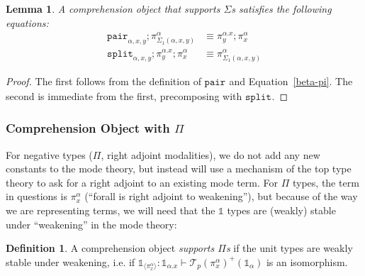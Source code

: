 \documentclass[10pt]{article}
\newtheorem{lemma}{Lemma}
\theoremstyle{definition}
\newtheorem{definition}{Definition}
\newcommand{\id}{\mathsf{id}}
\newcommand\TrPlus[2]{\ensuremath{{#1}^+(#2)}}
\newcommand\El[2]{\mathcal{T}_{#1}(#2)}
\newcommand\bdot[0]{\mathbin{.}}
\newcommand\ApPlus[2]{\ensuremath{{#1}^+ \langle #2 \rangle }}
\newcommand{\tdot}{\ensuremath{\mathtt{dot}}}
\newcommand\One{\ensuremath{\mathds{1}}}
\newcommand\ApOne[1]{\ensuremath{\One_{\langle {#1} \rangle }}}
\newcommand\contract[1]{\ensuremath{\mathtt{contract}_{#1}}}
\newcommand\fibpair[1]{\ensuremath{\mathtt{fibpair}_{#1}}}
\newcommand\pair[1]{\ensuremath{\mathtt{pair}_{#1}}}
\newcommand\tsplit[1]{\ensuremath{\mathtt{split}_{#1}}}
\begin{document}

\begin{lemma}
A comprehension object that supports $\Sigma$s satisfies the following equations:
\begin{align}
\pair{\alpha,x,y};\pi^\alpha_{\Sigma_1(\alpha, x, y)} &\equiv \pi^{\alpha.x}_y;\pi^\alpha_x \\
\tsplit{\alpha,x,y};\pi^{\alpha.x}_y;\pi^\alpha_x &\equiv \pi^\alpha_{\Sigma_1(\alpha, x, y)} %
\end{align}
\end{lemma}
\begin{proof}
The first follows from the definition of $\pair{}$ and Equation~\ref{beta-pi}. The second is immediate from the first, precomposing with $\tsplit{}$. 
\end{proof}

\subsubsection{Comprehension Object with $\Pi$}

For negative types ($\Pi$, right adjoint modalities), we do not add any
new constants to the mode theory, but instead will use a mechanism of
the top type theory to ask for a right adjoint to an existing mode
term.  For $\Pi$ types, the term in questions is $\pi^\alpha_x$
(``forall is right adjoint to weakening''), but because of the way we
are representing terms, we will need that the $\One$ types are (weakly)
stable under ``weakening'' in the mode theory: 

\begin{definition}\label{def:supports-pis}
  A comprehension object \emph{supports $\Pi$s} if
  the unit types are weakly stable under weakening, i.e.
  if 
  $\ApOne{\pi^\alpha_x} :
\One_{\alpha.x} \vdash \TrPlus{\El p {\pi^\alpha_x}}{\One_\alpha}$ is an
isomorphism.
\end{definition}
\end{document}
